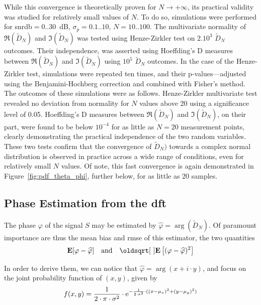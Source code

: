 While this convergence is theoretically proven for $N\rightarrow + \infty$, its practical validity was studied for relatively small values of $N$. To do so, simulations were performed for \gls{snrdb}$=0..30$~dB, $\sigma_p=0.1..10${\degree}, $N=10..100$. The multivariate normality of $\Re{(\widetilde{D}_N)}$ and $\Im{(\widetilde{D}_N)}$ was tested using Henze-Zirkler test\cite{henze1990} on $2.10^3$ $\widetilde{D}_N$ outcomes. Their independence, was asserted using Hoeffding's D measures\cite{fujita2009} between $\Re{(\widetilde{D}_N)}$ and $\Im{(\widetilde{D}_N)}$ using $10^5$ $\widetilde{D}_N$ outcomes. In the case of the Henze-Zirkler test, simulations were repeated ten times, and their p-values---adjusted using the Benjamini-Hochberg correction\cite{benjamini1995} and combined with Fisher's method. The outcomes of these simulations were as follows. Henze-Zirkler multivariate test revealed no deviation from normality for $N$ values above 20 using a significance level of 0.05. Hoeffding's D measures between $\Re{(\widetilde{D}_N)}$ and $\Im{(\widetilde{D}_N)}$, on their part, were found to be below $10^{-4}$ for as little as $N=20$ measurement points, clearly demonstrating the practical independence of the two random variables. These two tests confirm that the convergence of $\widetilde{D}_N)$ towards a complex normal distribution is observed in practice across a wide range of conditions, even for relatively small $N$ values. Of note, this fast convergence is again demonstrated in Figure~\ref{fig:pdf_theta_phi}, further below, for as little as 20 samples.

\subsection{Phase Estimation from the \texorpdfstring{\gls{dft}}{DFT}}\label{sect:choos:apsipa:phase_est}

The phase $\varphi$ of the signal $S$ may be estimated by $\widehat{\varphi} = \arg(\widetilde{D}_N)$. Of paramount importance are thus the mean bias and \gls{rmse} of this estimator, \ie{} the two quantities
\begin{equation}
	\esp[\varphi - \widehat{\varphi}] \quad \text{and} \quad \sqrt{\esp\left[(\varphi - \widehat{\varphi})^2 \right]}
\end{equation}

In order to derive them, we can notice that $\widehat{\varphi}=\arg(x + i\cdot y)$, and focus on the joint probability function of $(x,y)$, given by
\begin{equation}
	f(x,y) = \frac{1}{2 \cdot \pi \cdot \sigma^2} \cdot \mathrm{e}^{-\frac{1}{2 \cdot \sigma^2}\cdot ((x - \mu_x)^2+(y-\mu_y)^2)}
\end{equation}

